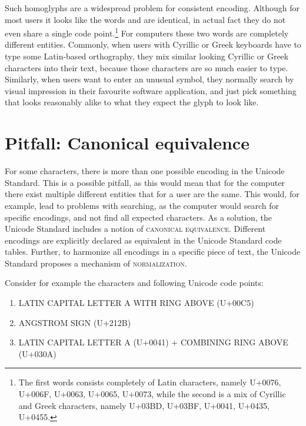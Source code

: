Such homoglyphs are a widespread problem for consistent encoding. Although for most users it looks like the words and are identical, in actual fact they do not even share a single code point.\footnote{The first words consists completely of Latin characters, namely U+0076, U+006F, U+0063, U+0065, U+0073, while the second is a mix of Cyrillic and Greek characters, namely U+03BD, U+03BF, U+0041, U+0435, U+0455.} For computers these two words are completely different entities. Commonly, when users with Cyrillic or Greek keyboards have to type some Latin-based orthography, they mix similar looking Cyrillic or Greek characters into their text, because those characters are so much easier to type. Similarly, when users want to enter an unusual symbol, they normally search by visual impression in their favourite software application, and just pick something that looks reasonably alike to what they expect the glyph to look like.

\section{Pitfall: Canonical equivalence}
\label{pitfall-canonical-equivalence}

For some characters, there is more than one possible encoding in the Unicode Standard. This is a possible pitfall, as this would mean that for the computer there exist multiple different entities that for a user are the same. This would, for example, lead to problems with searching, as the computer would search for specific encodings, and not find all expected characters. As a solution, the Unicode Standard includes a notion of \textsc{canonical equivalence}. Different encodings are explicitly declared as equivalent in the Unicode Standard code tables. Further, to harmonize all encodings in a specific piece of text, the Unicode Standard proposes a mechanism of \textsc{normalization}.

Consider for example the characters and following Unicode code points:
\begin{enumerate}
	\def\labelenumi{\arabic{enumi}.} 
	\item LATIN CAPITAL LETTER A WITH RING ABOVE (U+00C5) 
	\item ANGSTROM SIGN (U+212B) 
	\item LATIN CAPITAL LETTER A (U+0041) + COMBINING RING ABOVE (U+030A) 
\end{enumerate}

